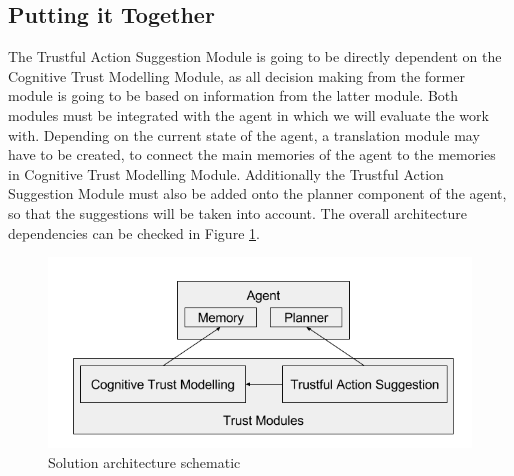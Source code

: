 \subsection{Putting it Together}
\label{subsec:Solution:Putting it Together}
The Trustful Action Suggestion Module is going to be directly dependent on the Cognitive Trust Modelling Module, as all decision making from the former module is going to be based on information from the latter module.
Both modules must be integrated with the agent in which we will evaluate the work with. Depending on the current state of the agent, a translation module may have to be created, to connect the main memories of the agent to the memories in Cognitive Trust Modelling Module. Additionally the Trustful Action Suggestion Module must also be added onto the planner component of the agent, so that the suggestions will be taken into account.
The overall architecture dependencies can be checked in Figure \ref{fig:arquitecture}. 


\begin{figure}[hbt]
	\centering
	\includegraphics[width=\textwidth]{figures/arquitecture.png}
	\caption{Solution architecture schematic}
	\label{fig:arquitecture}
\end{figure}
